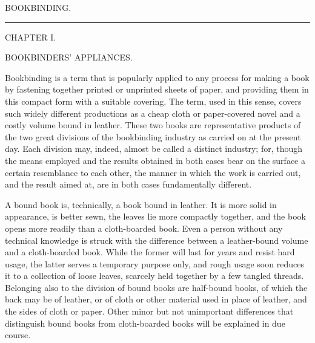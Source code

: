 \documentclass[twoside]{book}
\begin{document}
\pagebreak

\thispagestyle{empty}


\pagestyle{fancy}
\fancyhead[LE,RO]{\thepage}


\thispagestyle{empty}

\vspace*{\fill}

\begin{center}

\begin{Huge}BOOKBINDING. \\ \end{Huge}

\begin{center}\rule{0.5cm}{1pt.}\end{center}

\begin{large}CHAPTER I.\end{large}

\begin{small}BOOKBINDERS' APPLIANCES.\end{small}

\end{center}

\noindent
Bookbinding is a term that is popularly applied to
any process for making a book by fastening together
printed or unprinted sheets of paper, and providing
them in this compact form with a suitable
covering. The term, used in this sense, covers
such widely different productions as a cheap cloth
or paper-covered novel and a costly volume bound
in leather. These two books are representative
products of the two great divisions of the bookbinding
industry as carried on at the present day. Each
division may, indeed, almost be called a distinct
industry; for, though the means employed and the
results obtained in both cases bear on the surface
a certain resemblance to each other, the manner in
which the work is carried out, and the result aimed
at, are in both cases fundamentally different.

A bound book is, technically, a book bound in
leather. It is more solid in appearance, is better
sewn, the leaves lie more compactly together, and
the book opens more readily than a cloth-boarded
book. Even a person without any technical knowledge
is struck with the difference between a
leather-bound volume and a cloth-boarded book.
While the former will last for years and resist hard
usage, the latter serves a temporary purpose only,
and rough usage soon reduces it to a collection of
loose leaves, scarcely held together by a few tangled
threads. Belonging also to the division of bound
\pagebreak
books are half-bound books, of which the back may
be of leather, or of cloth or other material used in
place of leather, and the sides of cloth or paper.
Other minor but not unimportant differences that
distinguish bound books from cloth-boarded books
will be explained in due course.
\end{document}
